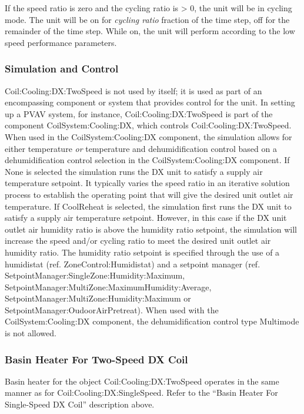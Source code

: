 If the speed ratio is zero and the cycling ratio is \textgreater{} 0, the unit will be in cycling mode. The unit will be on for \emph{cycling ratio} fraction of the time step, off for the remainder of the time step. While on, the unit will perform according to the low speed performance parameters.

\subsubsection{Simulation and Control}\label{simulation-and-control-001}

Coil:Cooling:DX:TwoSpeed is not used by itself; it is used as part of an encompassing component or system that provides control for the unit. In setting up a PVAV system, for instance, Coil:Cooling:DX:TwoSpeed is part of the component CoilSystem:Cooling:DX, which controls Coil:Cooling:DX:TwoSpeed. When used in the CoilSystem:Cooling:DX component, the simulation allows for either temperature \emph{or} temperature and dehumidification control based on a dehumidification control selection in the CoilSystem:Cooling:DX component. If None is selected the simulation runs the DX unit to satisfy a supply air temperature setpoint. It typically varies the speed ratio in an iterative solution process to establish the operating point that will give the desired unit outlet air temperature. If CoolReheat is selected, the simulation first runs the DX unit to satisfy a supply air temperature setpoint. However, in this case if the DX unit outlet air humidity ratio is above the humidity ratio setpoint, the simulation will increase the speed and/or cycling ratio to meet the desired unit outlet air humidity ratio. The humidity ratio setpoint is specified through the use of a humidistat (ref. ZoneControl:Humidistat) and a setpoint manager (ref. SetpointManager:SingleZone:Humidity:Maximum, SetpointManager:MultiZone:MaximumHumidity:Average,~ SetpointManager:MultiZone:Humidity:Maximum or SetpointManager:OudoorAirPretreat). When used with the CoilSystem:Cooling:DX component, the dehumidification control type Multimode is not allowed.

\subsubsection{Basin Heater For Two-Speed DX Coil}\label{basin-heater-for-two-speed-dx-coil}

Basin heater for the object Coil:Cooling:DX:TwoSpeed operates in the same manner as for Coil:Cooling:DX:SingleSpeed. Refer to the ``Basin Heater For Single-Speed DX Coil'' description above.

